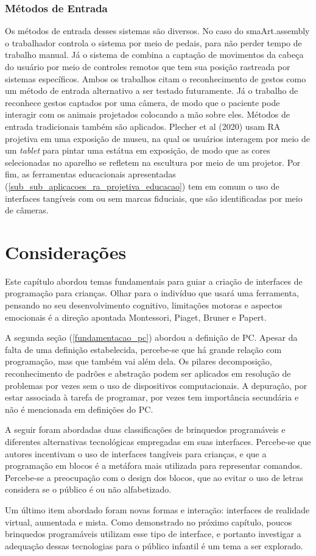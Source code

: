 \subsubsection{Métodos de Entrada}
Os métodos de entrada desses sistemas são diversos. No caso do smaArt.assembly o trabalhador controla o sistema por meio de pedais, para não perder tempo de trabalho manual. Já o sistema de  combina a captação de movimentos da cabeça do usuário por meio de controles remotos que tem sua posição rastreada por sistemas específicos. Ambos os trabalhos citam o reconhecimento de gestos como um método de entrada alternativo a ser testado futuramente. Já o trabalho de  reconhece gestos captados por uma câmera, de modo que o paciente pode interagir com os animais projetados colocando a mão sobre eles. Métodos de entrada tradicionais também são aplicados. Plecher et al (2020) usam RA projetiva em uma exposição de museu, na qual os usuários interagem por meio de um \textit{tablet} para pintar uma estátua em exposição, de modo que as cores selecionadas no aparelho se refletem na escultura por meio de um projetor. Por fim, as ferramentas educacionais apresentadas (\autoref{sub_sub_aplicacoes_ra_projetiva_educacao}) tem em comum o uso de interfaces tangíveis com ou sem marcas fiduciais, que são identificadas por meio de câmeras.

\section{Considerações}

Este capítulo abordou temas fundamentais para guiar a criação de interfaces de programação para crianças. Olhar para o indivíduo que usará uma ferramenta, pensando no seu desenvolvimento cognitivo, limitações motoras e aspectos emocionais é a direção apontada Montessori, Piaget, Bruner e Papert. 

A segunda seção (\autoref{fundamentacao_pc}) abordou a definição de \acl{PC}. Apesar da falta de uma definição estabelecida, percebe-se que há grande relação com programação, mas que também vai além dela. Os pilares decomposição, reconhecimento de padrões e abstração podem ser aplicados em resolução de problemas por vezes sem o uso de dispositivos computacionais. A depuração, por estar associada à tarefa de programar, por vezes tem importância secundária e não é mencionada em definições do PC. 

A seguir foram abordadas duas classificações de brinquedos programáveis e diferentes alternativas tecnológicas empregadas em suas interfaces. Percebe-se que autores incentivam o uso de interfaces tangíveis para crianças, e que a programação em blocos é a metáfora mais utilizada para representar comandos. Percebe-se a preocupação com o design dos blocos, que ao evitar o uso de letras considera se o público é ou não alfabetizado.

Um último item abordado foram novas formas e interação: interfaces de realidade virtual, aumentada e mista. Como demonstrado no próximo capítulo, poucos brinquedos programáveis utilizam esse tipo de interface, e portanto investigar a adequação dessas tecnologias para o público infantil é um tema a ser explorado.
